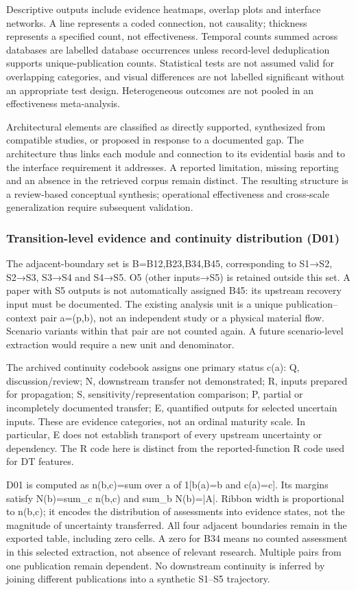 Descriptive outputs include evidence heatmaps, overlap plots and interface networks. A line represents a coded connection, not causality; thickness represents a specified count, not effectiveness. Temporal counts summed across databases are labelled database occurrences unless record-level deduplication supports unique-publication counts. Statistical tests are not assumed valid for overlapping categories, and visual differences are not labelled significant without an appropriate test design. Heterogeneous outcomes are not pooled in an effectiveness meta-analysis.

Architectural elements are classified as directly supported, synthesized from compatible studies, or proposed in response to a documented gap. The architecture thus links each module and connection to its evidential basis and to the interface requirement it addresses. A reported limitation, missing reporting and an absence in the retrieved corpus remain distinct. The resulting structure is a review-based conceptual synthesis; operational effectiveness and cross-scale generalization require subsequent validation.

\subsubsection{Transition-level evidence and continuity distribution (D01)}
The adjacent-boundary set is B={B12,B23,B34,B45}, corresponding to S1→S2, S2→S3, S3→S4 and S4→S5. O5 (other inputs→S5) is retained outside this set. A paper with S5 outputs is not automatically assigned B45: its upstream recovery input must be documented. The existing analysis unit is a unique publication–context pair a=(p,b), not an independent study or a physical material flow. Scenario variants within that pair are not counted again. A future scenario-level extraction would require a new unit and denominator.

The archived continuity codebook assigns one primary status c(a): Q, discussion/review; N, downstream transfer not demonstrated; R, inputs prepared for propagation; S, sensitivity/representation comparison; P, partial or incompletely documented transfer; E, quantified outputs for selected uncertain inputs. These are evidence categories, not an ordinal maturity scale. In particular, E does not establish transport of every upstream uncertainty or dependency. The R code here is distinct from the reported-function R code used for DT features.

D01 is computed as n(b,c)=sum over a of 1[b(a)=b and c(a)=c]. Its margins satisfy N(b)=sum\_c n(b,c) and sum\_b N(b)=|A|. Ribbon width is proportional to n(b,c); it encodes the distribution of assessments into evidence states, not the magnitude of uncertainty transferred. All four adjacent boundaries remain in the exported table, including zero cells. A zero for B34 means no counted assessment in this selected extraction, not absence of relevant research. Multiple pairs from one publication remain dependent. No downstream continuity is inferred by joining different publications into a synthetic S1–S5 trajectory.

